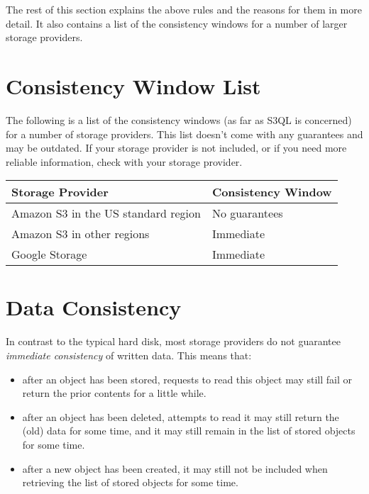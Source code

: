 \documentclass[letterpaper,10pt,english]{sphinxmanual}
\begin{document}
The rest of this section explains the above rules and the reasons for
them in more detail. It also contains a list of the consistency
windows for a number of larger storage providers.


\section{Consistency Window List}
\label{durability:consistency-window-list}
The following is a list of the consistency windows (as far as S3QL is
concerned) for a number of storage providers. This list doesn't come
with any guarantees and may be outdated. If your storage provider is
not included, or if you need more reliable information, check with
your storage provider.

\begin{tabulary}{\linewidth}{|L|L|}
\hline
\textsf{\relax 
Storage Provider
} & \textsf{\relax 
Consistency Window
}\\
\hline
Amazon S3 in the US standard region
 & 
No guarantees
\\
\hline
Amazon S3 in other regions
 & 
Immediate
\\
\hline
Google Storage
 & 
Immediate
\\
\hline\end{tabulary}



\section{Data Consistency}
\label{durability:data-consistency}
In contrast to the typical hard disk, most storage providers do not
guarantee \emph{immediate consistency} of written data. This means that:
\begin{itemize}
\item {} 
after an object has been stored, requests to read this object may
still fail or return the prior contents for a little while.

\item {} 
after an object has been deleted, attempts to read it may still
return the (old) data for some time, and it may still remain in the
list of stored objects for some time.

\item {} 
after a new object has been created, it may still not be included
when retrieving the list of stored objects for some time.

\end{itemize}
\end{document}
